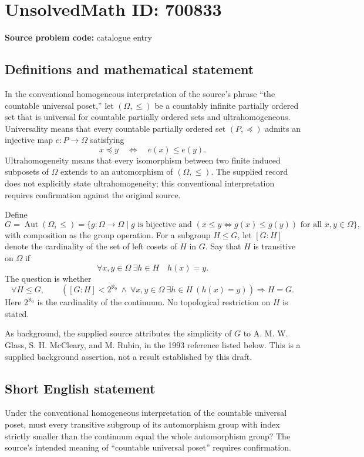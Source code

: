 \documentclass[11pt]{article}
\begin{document}
\section*{UnsolvedMath ID: 700833}
\textbf{Source problem code:} catalogue entry
\subsection{Definitions and mathematical statement}
In the conventional homogeneous interpretation of the source's phrase ``the countable universal poset,'' let $(\Omega,\leq)$ be a countably infinite partially ordered set that is universal for countable partially ordered sets and ultrahomogeneous. Universality means that every countable partially ordered set $(P,\preceq)$ admits an injective map $e:P\to\Omega$ satisfying
\[
x\preceq y\quad\Longleftrightarrow\quad e(x)\leq e(y).
\]
Ultrahomogeneity means that every isomorphism between two finite induced subposets of $\Omega$ extends to an automorphism of $(\Omega,\leq)$. The supplied record does not explicitly state ultrahomogeneity; this conventional interpretation requires confirmation against the original source.

Define
\[
G=\operatorname{Aut}(\Omega,\leq)
 =\{g:\Omega\to\Omega\mid g\text{ is bijective and }(x\leq y\Longleftrightarrow g(x)\leq g(y))\text{ for all }x,y\in\Omega\},
\]
with composition as the group operation. For a subgroup $H\leq G$, let $[G:H]$ denote the cardinality of the set of left cosets of $H$ in $G$. Say that $H$ is transitive on $\Omega$ if
\[
\forall x,y\in\Omega\ \exists h\in H\quad h(x)=y.
\]
The question is whether
\[
\forall H\leq G,\qquad
\left([G:H]<2^{\aleph_0}\ \land\ \forall x,y\in\Omega\ \exists h\in H\ (h(x)=y)\right)
\Longrightarrow H=G.
\]
Here $2^{\aleph_0}$ is the cardinality of the continuum. No topological restriction on $H$ is stated.

As background, the supplied source attributes the simplicity of $G$ to A. M. W. Glass, S. H. McCleary, and M. Rubin, in the 1993 reference listed below. This is a supplied background assertion, not a result established by this draft.
\subsection{Short English statement}
Under the conventional homogeneous interpretation of the countable universal poset, must every transitive subgroup of its automorphism group with index strictly smaller than the continuum equal the whole automorphism group? The source's intended meaning of ``countable universal poset'' requires confirmation.
\end{document}
